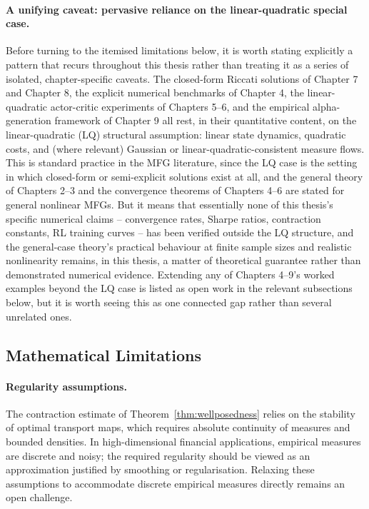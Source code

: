 \paragraph{A unifying caveat: pervasive reliance on the linear-quadratic special
case.} Before turning to the itemised limitations below, it is worth stating
explicitly a pattern that recurs throughout this thesis rather than treating it
as a series of isolated, chapter-specific caveats. The closed-form Riccati
solutions of Chapter 7 and Chapter 8, the explicit numerical benchmarks of
Chapter 4, the linear-quadratic actor-critic experiments of Chapters 5--6, and
the empirical alpha-generation framework of Chapter 9 all rest, in their
quantitative content, on the linear-quadratic (LQ) structural assumption: linear
state dynamics, quadratic costs, and (where relevant) Gaussian or
linear-quadratic-consistent measure flows. This is standard practice in the MFG
literature, since the LQ case is the setting in which closed-form or
semi-explicit solutions exist at all, and the general theory of Chapters 2--3
and the convergence theorems of Chapters 4--6 are stated for general nonlinear
MFGs. But it means that essentially none of this thesis's specific numerical
claims -- convergence rates, Sharpe ratios, contraction constants, RL training
curves -- has been verified outside the LQ structure, and the general-case
theory's practical behaviour at finite sample sizes and realistic nonlinearity
remains, in this thesis, a matter of theoretical guarantee rather than
demonstrated numerical evidence. Extending any of Chapters 4--9's worked
examples beyond the LQ case is listed as open work in the relevant subsections
below, but it is worth seeing this as one connected gap rather than several
unrelated ones.

\subsection{Mathematical Limitations}

\paragraph{Regularity assumptions.} The contraction estimate of
Theorem~\ref{thm:wellposedness} relies on the stability of optimal transport maps,
which requires absolute continuity of measures and bounded densities. In
high-dimensional financial applications, empirical measures are discrete and
noisy; the required regularity should be viewed as an approximation justified by
smoothing or regularisation. Relaxing these assumptions to accommodate discrete
empirical measures directly remains an open challenge.

